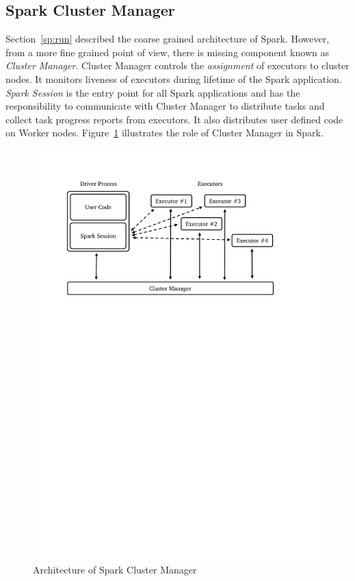 \subsection{Spark Cluster Manager}
\label{sp:cluster}

Section~\ref{sp:run} described the coarse grained architecture of Spark. However, from a more fine grained point of view, there is missing component known as \emph{Cluster Manager}. Cluster Manager controls the \emph{assignment} of executors to cluster nodes. It monitors liveness of executors during lifetime of the Spark application. \emph{Spark Session} is the entry point for all Spark applications and has the responsibility to communicate with Cluster Manager to distribute tasks and collect task progress reports from executors. It also distributes user defined code on Worker nodes. Figure~\ref{fig:spark-cluster} illustrates the role of Cluster Manager in Spark.
\begin{figure}[!htbp]
    \centering
    \includegraphics[clip,trim=2.4cm 19cm 3.5cm 2cm]{spark-cluster.pdf}
    \caption[Architecture of Spark Cluster Manager]{Architecture of Spark Cluster Manager\footnotemark}
    \label{fig:spark-cluster}
\end{figure}

